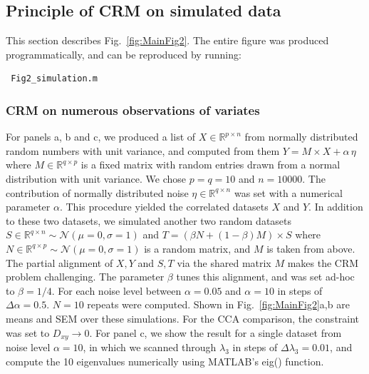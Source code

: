 \documentclass{article}
\newcommand{\R}{\mathbb{R}}
\begin{document}
\subsection*{Principle of CRM on simulated data}

This section describes Fig.~\ref{fig:MainFig2}. The entire figure was produced programmatically, and can be reproduced by running:
\begin{verbatim} Fig2_simulation.m \end{verbatim}

\subsubsection*{CRM on numerous observations of variates}
For panels a, b and c, we produced a list of $X\in\R^{p\times n}$ from normally distributed random numbers with unit variance, and computed from them $Y=M\times X + \alpha\,\eta $ where $M\in\R^{q\times p}$ is a fixed matrix with random entries drawn from a normal distribution with unit variance. We chose $p=q=10$ and $n=10000$. The contribution of normally distributed noise $\eta\in\R^{q\times n}$ was set with a numerical parameter $\alpha$. This procedure yielded the correlated datasets $X$ and $Y$. In addition to these two datasets, we simulated another two random datasets $S\in\R^{q\times n}\sim\mathcal{N}(\mu=0,\sigma=1)$ and $T=(\beta N + (1-\beta)M) \times S$ where $N\in\R^{q\times p}\sim\mathcal{N}(\mu=0,\sigma=1)$ is a random matrix, and $M$ is taken from above. The partial alignment of $X,Y$ and $S,T$ via the shared matrix $M$ makes the CRM problem challenging. The parameter $\beta$ tunes this alignment, and was set ad-hoc to $\beta=1/4$. For each noise level between $\alpha=0.05$ and $\alpha=10$ in steps of $\Delta\alpha=0.5$. $N=10$ repeats were computed. Shown in Fig.~\ref{fig:MainFig2}a,b are means and SEM over these simulations. For the CCA comparison, the constraint was set to $D_{xy}\to 0$. For panel c, we show the result for a single dataset from noise level $\alpha=10$, in which we scanned through $\lambda_3$ in steps of $\Delta\lambda_3=0.01$, and compute the 10 eigenvalues numerically using MATLAB's eig() function.
\end{document}
